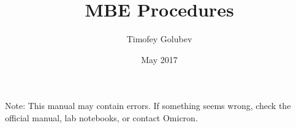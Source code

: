 \documentclass[12pt]{book}
\begin{document}
\title{\huge MBE Procedures}


\author{Timofey Golubev}
\date{May 2017}

\frontmatter
\maketitle 
Note: This manual may contain errors. If something seems wrong, check the official manual, lab notebooks, or contact Omicron.
\tableofcontents

\mainmatter






\end{document}
